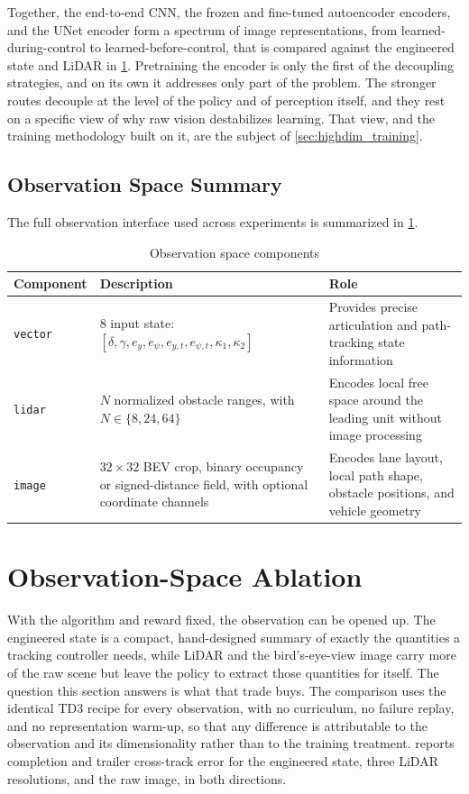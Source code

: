 Together, the end-to-end CNN, the frozen and fine-tuned autoencoder encoders, and the UNet encoder form a spectrum of image representations, from learned-during-control to learned-before-control, that is compared against the engineered state and LiDAR in \cref{sec:obs_ablation}. Pretraining the encoder is only the first of the decoupling strategies, and on its own it addresses only part of the problem. The stronger routes decouple at the level of the policy and of perception itself, and they rest on a specific view of why raw vision destabilizes learning. That view, and the training methodology built on it, are the subject of \cref{sec:highdim_training}.

\subsection{Observation Space Summary}

The full observation interface used across experiments is summarized in \cref{tab:observation_components}.

\begin{table}[H]
\centering
\caption{Observation space components}
\label{tab:observation_components}
\begin{tabular}{p{3cm} p{5cm} p{5cm}}
\toprule
Component & Description & Role \\
\midrule
\texttt{vector} & 8 input state: $[\delta,\gamma,e_y,e_\psi,e_{y,t},e_{\psi,t},\kappa_1,\kappa_2]$ & Provides precise articulation and path-tracking state information \\
\texttt{lidar} & $N$ normalized obstacle ranges, with $N \in \{8,24,64\}$ & Encodes local free space around the leading unit without image processing \\
\texttt{image}  & $32 \times 32$ BEV crop, binary occupancy or signed-distance field, with optional coordinate channels & Encodes lane layout, local path shape, obstacle positions, and vehicle geometry \\
\bottomrule
\end{tabular}
\end{table}

\section{Observation-Space Ablation}
\label{sec:obs_ablation}

With the algorithm and reward fixed, the observation can be opened up. The engineered state is a compact, hand-designed summary of exactly the quantities a tracking controller needs, while LiDAR and the bird's-eye-view image carry more of the raw scene but leave the policy to extract those quantities for itself. The question this section answers is what that trade buys. The comparison uses the identical TD3 recipe for every observation, with no curriculum, no failure replay, and no representation warm-up, so that any difference is attributable to the observation and its dimensionality rather than to the training treatment.  reports completion and trailer cross-track error for the engineered state, three LiDAR resolutions, and the raw image, in both directions.

